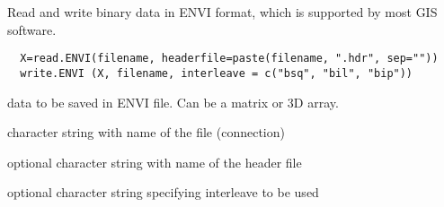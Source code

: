 \begin{Description}\relax
Read and write binary data in ENVI format, which is supported by 
most GIS software.
\end{Description}
\begin{Usage}
\begin{verbatim}
  X=read.ENVI(filename, headerfile=paste(filename, ".hdr", sep="")) 
  write.ENVI (X, filename, interleave = c("bsq", "bil", "bip")) 
\end{verbatim}
\end{Usage}
\begin{Arguments}
\begin{ldescription}
\item[\code{X}] data to be saved in ENVI file. Can be a matrix or 3D array.
\item[\code{filename}] character string with name of the file (connection)
\item[\code{headerfile}] optional character string with name of the header file
\item[\code{interleave}] optional character string specifying interleave to be used
\end{ldescription}
\end{Arguments}
